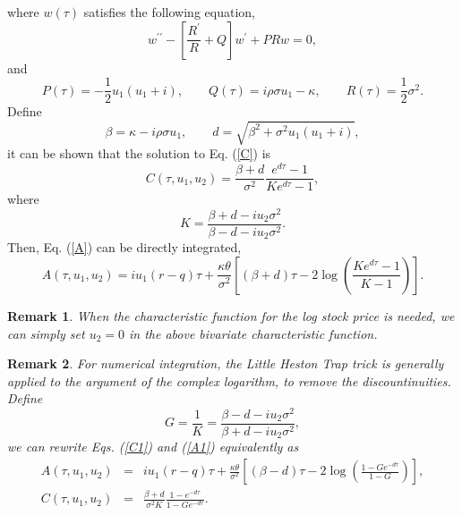 \documentclass[12pt]{article}
\newtheorem{remark}{Remark}
\begin{document}
    where $w(\tau)$ satisfies the following equation,
    \begin{equation}
      w^{\prime\prime}-\left[\frac{R^{\prime}}{R}+Q\right]w^{\prime}+PRw=0,
    \end{equation}
    and
    \begin{equation}
      P(\tau) = -\frac{1}{2}u_1(u_1+i), \quad\quad Q(\tau)=i\rho\sigma u_1-\kappa,
      \quad\quad R(\tau)=\frac{1}{2}\sigma^2.
    \end{equation}
    Define
    \begin{equation}
      \beta = \kappa-i\rho\sigma u_1, \quad\quad  d=\sqrt{\beta^2+\sigma^2u_1(u_1+i)},
    \end{equation}
    it can be shown that the solution to Eq. (\ref{C}) is
    \begin{equation}
      C(\tau,u_1,u_2)=\frac{\beta+d}{\sigma^2}\frac{e^{d\tau}-1}{Ke^{d\tau}-1},
      \label{C1}
    \end{equation}
    where
    \begin{equation}
      K=\frac{\beta+d-iu_2\sigma^2}{\beta-d-iu_2\sigma^2}.
    \end{equation}
    Then, Eq. (\ref{A}) can be directly integrated,
    \begin{equation}
      A(\tau,u_1,u_2)=iu_1(r-q)\tau+\frac{\kappa\theta}{\sigma^2}\left[(\beta+d)\tau
                      -2\log\left(\frac{Ke^{d\tau}-1}{K-1}\right)\right].
      \label{A1}
    \end{equation}

    \begin{remark}
      When the characteristic function for the log stock price is needed, we can simply set $u_2=0$ in the 
      above bivariate characteristic function.
    \end{remark}

    \begin{remark}
      For numerical integration, the {\it Little Heston Trap} trick is generally applied to the argument of the 
      complex logarithm, to remove the discountinuities. Define
      \begin{equation}
        G=\frac{1}{K}=\frac{\beta-d-iu_2\sigma^2}{\beta+d-iu_2\sigma^2},
      \end{equation}
      we can rewrite Eqs. (\ref{C1}) and (\ref{A1}) equivalently as
      \begin{eqnarray}
        A(\tau,u_1,u_2) &=& iu_1(r-q)\tau+\frac{\kappa\theta}{\sigma^2}\left[(\beta-d)\tau
                      -2\log\left(\frac{1-Ge^{-d\tau}}{1-G}\right)\right], \\
        C(\tau,u_1,u_2) &=& \frac{\beta+d}{\sigma^2K}\frac{1-e^{-d\tau}}{1-Ge^{-d\tau}}.
      \end{eqnarray}
    \end{remark}
\end{document}
